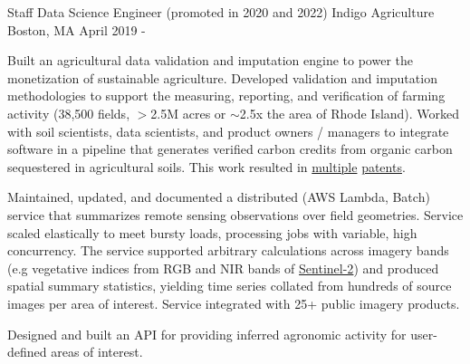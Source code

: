 

\begin{cventries}

  \cventry
    {Staff Data Science Engineer (promoted in 2020 and 2022)} %
    {Indigo Agriculture} %
    {Boston, MA} %
    {April 2019 -} %
    {
      \begin{cvitems} %
        \item {
            Built an agricultural data validation and imputation engine 
            to power the monetization of sustainable agriculture. 
            Developed validation and imputation methodologies to 
            support the measuring, reporting, and verification of 
            farming activity (38,500 fields, $>$2.5M acres or $\sim$2.5x the
            area of Rhode Island). Worked with soil 
            scientists, data scientists, and product owners / managers 
            to integrate software in a pipeline that generates 
            verified carbon credits from organic carbon sequestered in 
            agricultural soils. This work resulted in 
            \href{https://patents.google.com/patent/US20230186408A1}{multiple} 
            \href{https://patents.google.com/patent/US20230078852A1}{patents}.
        }
        \item {
            Maintained, updated, and documented a distributed (AWS Lambda, Batch) service 
            that summarizes remote sensing observations over field geometries. Service scaled elastically
            to meet bursty loads, processing jobs with variable, high concurrency. The service supported
            arbitrary calculations across imagery bands (e.g vegetative indices from RGB and NIR bands of
            \href{https://www.esa.int/Applications/Observing_the_Earth/Copernicus/Sentinel-2}{Sentinel-2})
            and produced spatial summary statistics, yielding time series collated from hundreds of
            source images per area of interest. Service integrated with 25+ public imagery products.
        }
        \item {
            Designed and built an API for providing inferred agronomic activity for user-defined areas of interest.
}
\end{cvitems}}
\end{cventries}
